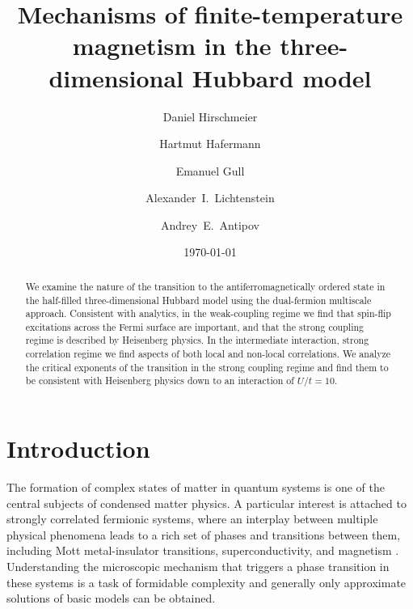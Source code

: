 \documentclass[aps,prb,twocolumn,amsmath,notitlepage,floatfix,footinbib,superscriptaddress,showpacs, showkeys]{revtex4-1}
\begin{document}
\title{Mechanisms of finite-temperature magnetism in the three-dimensional Hubbard model}  

\author{Daniel Hirschmeier}
\author{Hartmut Hafermann}
\author{Emanuel Gull}
\author{Alexander~I.~Lichtenstein}
\author{Andrey~E.~Antipov}

\date{\today}

\begin{abstract}
We examine the nature of the transition to the antiferromagnetically ordered state in the half-filled three-dimensional Hubbard model using the dual-fermion multiscale approach. Consistent with analytics, in the weak-coupling regime we find that spin-flip excitations across the Fermi surface are important, and that the strong coupling regime is described by Heisenberg physics. In the intermediate interaction, strong correlation regime we find aspects of both local and non-local correlations. We analyze the critical exponents of the transition in the strong coupling regime and find them to be consistent with Heisenberg physics down to an interaction of $U/t=10$.
\end{abstract}


\maketitle

\section{Introduction}

The formation of complex states of matter in quantum systems is one of the central subjects of condensed matter physics. 
A particular interest is attached to strongly correlated fermionic systems, where an interplay between multiple physical phenomena leads to a rich set of phases and transitions between them, including Mott metal-insulator transitions, superconductivity, and magnetism \cite{Dagotto1994,Kotliar2006}. 
Understanding the microscopic mechanism that triggers a phase transition in these systems is a task of formidable complexity \cite{Troyer2005} and generally only approximate solutions of basic models can be obtained. 
\end{document}

